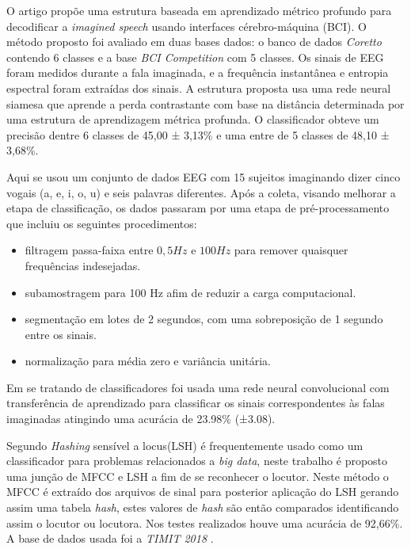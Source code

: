 \documentclass[a4paper,12pt,openright,oneside]{book}
\newenvironment{myenv}[1]
  {\begin{spacing}{#1}}
  {\end{spacing}}
\begin{document}
\begin{myenv}{1.5}
				\par O artigo \cite{lee2021decoding} propõe uma estrutura baseada em aprendizado métrico profundo para decodificar a \textit{imagined speech} usando interfaces cérebro-máquina (BCI). O método proposto foi avaliado em duas bases dados: o banco de dados \textit{Coretto} contendo 6 classes e a base \textit{BCI Competition} com 5 classes. Os sinais de EEG foram medidos durante a fala imaginada, e a frequência instantânea e entropia espectral foram extraídas dos sinais. A estrutura proposta usa uma rede neural siamesa que aprende a perda contrastante com base na distância determinada por uma estrutura de aprendizagem métrica profunda. O classificador obteve um precisão dentre 6 classes de 45,00 ± 3,13\% e uma entre de 5 classes de 48,10 ± 3,68\%.\newline
	
				\par Aqui \cite{tamm2020classification} se usou um conjunto de dados EEG com 15 sujeitos imaginando dizer cinco vogais (a, e, i, o, u) e seis palavras diferentes. Após a coleta, visando melhorar a etapa de classificação, os dados passaram por uma etapa de pré-processamento que incluiu os seguintes procedimentos:
				\begin{itemize}
					\item filtragem passa-faixa entre $0,5Hz$ e $100Hz$ para remover quaisquer frequências indesejadas.
					\item subamostragem para 100 Hz afim de reduzir a carga computacional.
					\item segmentação em lotes de 2 segundos, com uma sobreposição de 1 segundo entre os sinais.
					\item normalização para média zero e variância unitária.
				\end{itemize}
				Em se tratando de classificadores foi usada uma rede neural convolucional com transferência de aprendizado para classificar os sinais correspondentes às falas imaginadas atingindo uma acurácia de 23.98\% (±3.08).\newline
				
				\par Segundo \cite{8396208} \textit{Hashing} sensível a locus(LSH) é frequentemente usado como um classificador para problemas relacionados a \textit{big data}, neste trabalho é proposto uma junção de MFCC e LSH a fim de se reconhecer o locutor. Neste método o MFCC é extraído dos arquivos de sinal para posterior aplicação do LSH gerando assim uma tabela \textit{hash}, estes valores de \textit{hash} são então comparados identificando assim o locutor ou locutora. Nos testes realizados houve uma acurácia de 92,66\%. A base de dados usada foi a \textit{TIMIT 2018} \cite{TIMIT2018}.
				

\end{myenv}
\end{document}
